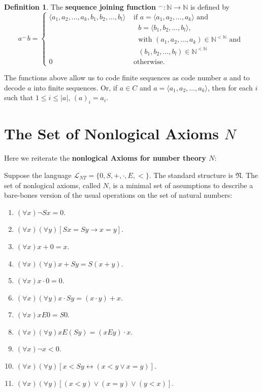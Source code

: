 \documentclass[11pt,letterpaper]{book}
\theoremstyle{definition}
\newtheorem{definition}{Definition}[section]
\begin{document}
\begin{definition}
The \textbf{sequence joining function} $ ^{\frown} : \mathbb{N} \rightarrow \mathbb{N}$ is defined by
\begin{equation}
a^{\frown} b =
\begin{cases}
\langle  a_1, a_2, \ldots, a_k, b_1, b_2, \ldots, b_l \rangle & \text{ if } a = \langle a_1,
a_2, \ldots, a_k \rangle \text{ and } \\
    & \quad b = \langle b_1, b_2, \ldots, b_l \rangle , \\
    & \quad \text{with } (a_1, a_2, \ldots, a_k) \in \mathbb{N} ^{ <
\mathbb{N}} \text{ and } \\
     & \quad (b_1, b_2, \ldots, b_l) \in \mathbb{N} ^{ < \mathbb{N}} \\
    0 & \text{ otherwise}.
\end{cases}
\nonumber
\end{equation}
\end{definition}



The functions above allow us to code finite sequences as code number $a$
and to decode $a$ into finite sequences. Or, if $a\in C$ and $a = \langle a_1,
a_2, \ldots, a_k \rangle $, then for each $i$ such that $1 \leq i \leq |a|$,
$(a)_i = a_i $.



\section{The Set of Nonlogical Axioms $N$}


Here we reiterate the \textbf{nonlogical Axioms for number theory $N$}:

Suppose the language $\mathcal{L}_{NT} = \{ 0, S, +, \cdot, E, < \}$.
The standard structure is $\mathfrak{N}$. The set of nonlogical axioms,
called $N$, is a minimal set of assumptions to describe a bare-bones
version of the usual operations on the set of natural numbers:
\begin{enumerate}\label{reiterate_axiom_N}
\item{$ (\forall x) \lnot S x = 0$.}
\item{$ (\forall x)(\forall y) [Sx = Sy \rightarrow x = y] $.}
\item{$ (\forall x) x + 0 = x $.}
\item{$ (\forall x)(\forall y)x + Sy = S(x+y) $.}
\item{$ (\forall x) x \cdot 0 = 0 $.}
\item{$ (\forall x)(\forall y) x \cdot Sy = (x \cdot y) + x $.}
\item{$ (\forall x) x E 0 = S 0 $.}
\item{$ (\forall x)(\forall y) x E (S y) = (x E y) \cdot x $.}
\item{$ (\forall x) \lnot x < 0 $.}
\item{$ (\forall x)(\forall y) [x < Sy \leftrightarrow (x < y \lor x = y
)] $.}
\item{$ (\forall x)(\forall y) [(x<y) \lor (x = y) \lor (y < x) ] $.}

\end{enumerate}
\end{document}
